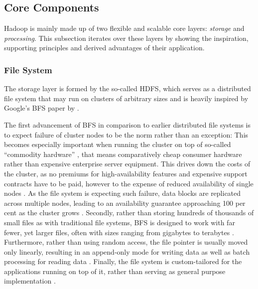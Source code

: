 \subsection{Core Components}
\label{hadoop-components}
\label{sota-hadoop-components}

Hadoop is mainly made up of two flexible and scalable core layers: \emph{storage} and \emph{processing}. This subsection iterates over these layers by showing the inspiration, supporting principles and derived advantages of their application.

\subsubsection{File System}
The storage layer is formed by the so-called \acf{HDFS}, which serves as a distributed file system that may run on clusters of arbitrary sizes and is heavily inspired by Google's \ac{BFS} paper by \textcite{ghemawat2003gfs}.

The first advancement of \ac{BFS} in comparison to earlier distributed file systems is to expect failure of cluster nodes to be the norm rather than an exception: This becomes especially important when running the cluster on top of so-called \enquote{commodity hardware} \autocite[p.~1]{ghemawat2003gfs}, that means comparatively cheap consumer hardware rather than expensive enterprise server equipment. This drives down the costs of the cluster, as no premiums for high-availability features and expensive support contracts have to be paid, however to the expense of reduced availability of single nodes \autocite[p.~1]{ghemawat2003gfs}. As the file system is expecting such failure, data blocks are replicated across multiple nodes, leading to an availability guarantee approaching 100 per cent as the cluster grows \autocite[p.~2]{ghemawat2003gfs}. Secondly, rather than storing hundreds of thousands of small files as with traditional file systems, \ac{BFS} is designed to work with far fewer, yet larger files, often with sizes ranging from gigabytes to terabytes \autocite[p.~2]{ghemawat2003gfs}. Furthermore, rather than using random access, the file pointer is usually moved only linearly, resulting in an append-only mode for writing data as well as batch processing for reading data \autocite[p.~2]{ghemawat2003gfs}. Finally, the file system is custom-tailored for the applications running on top of it, rather than serving as general purpose implementation \autocite[p.~2]{ghemawat2003gfs}.

